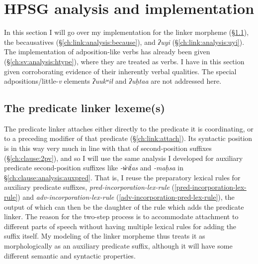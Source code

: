 \section{HPSG analysis and implementation} \label{ch:link:analysis}

In this section I will go over my implementation for the linker morpheme (\S\ref{ch:link:analysis:linker}), the becausatives (\S\ref{ch:link:analysis:because}), and \textit{ʔuyi} (\S\ref{ch:link:analysis:uyi}). The implementation of adposition-like verbs has already been given (\S\ref{ch:sv:analysis:htype}), where they are treated as verbs. I have in this section given corroborating evidence of their inherently verbal qualities. The special adpositions/little-\textit{v} elements \textit{ʔuukʷił} and \textit{ʔuḥtaa} are not addressed here.

\subsection{The predicate linker lexeme(s)} \label{ch:link:analysis:linker}

The predicate linker attaches either directly to the predicate it is coordinating, or to a preceding modifier of that predicate (\S\ref{ch:link:attach}). Its syntactic position is in this way very much in line with that of second-position suffixes (\S\ref{ch:clause:2pv}), and so I will use the same analysis I developed for auxiliary predicate second-position suffixes like \textit{-w̓it̓as} and \textit{-maḥsa} in \S\ref{ch:clause:analysis:auxpred}. That is, I reuse the preparatory lexical rules for auxiliary predicate suffixes, \textit{pred-incorporation-lex-rule} (\ref{pred-incorporation-lex-rule}) and \textit{adv-incorporation-lex-rule} (\ref{adv-incorporation-pred-lex-rule}), the output of which can then be the daughter of the rule which adds the predicate linker. The reason for the two-step process is to accommodate attachment to different parts of speech without having multiple lexical rules for adding the suffix itself. My modeling of the linker morpheme thus treats it as morphologically as an auxiliary predicate suffix, although it will have some different semantic and syntactic properties.

